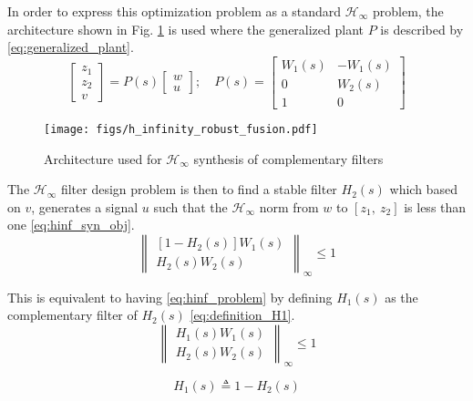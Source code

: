 \documentclass[letterpaper, 10 pt, conference]{ieeeconf}
\begin{document}
In order to express this optimization problem as a standard \(\mathcal{H}_\infty\) problem, the architecture shown in Fig. \ref{fig:h_infinity_robust_fusion} is used where the generalized plant \(P\) is described by \eqref{eq:generalized_plant}.
\begin{equation}
\label{eq:generalized_plant}
  \begin{bmatrix} z_1 \\ z_2 \\ v \end{bmatrix} = P(s) \begin{bmatrix} w\\u \end{bmatrix}; \quad P(s) = \begin{bmatrix}W_1(s) & -W_1(s) \\ 0 & W_2(s) \\  1 & 0 \end{bmatrix}
\end{equation}

\begin{figure}[htbp]
\centering
\texttt{[image: figs/h\_infinity\_robust\_fusion.pdf]}
\caption{\label{fig:h_infinity_robust_fusion}
Architecture used for \(\mathcal{H}_\infty\) synthesis of complementary filters}
\end{figure}

The \(\mathcal{H}_\infty\) filter design problem is then to find a stable filter \(H_2(s)\) which based on \(v\), generates a signal \(u\) such that the \(\mathcal{H}_\infty\) norm from \(w\) to \([z_1, \ z_2]\) is less than one \eqref{eq:hinf_syn_obj}.
\begin{equation}
\label{eq:hinf_syn_obj}
  \left\|\begin{matrix} \left[1 - H_2(s)\right] W_1(s) \\ H_2(s) W_2(s) \end{matrix}\right\|_\infty \le 1
\end{equation}

This is equivalent to having \eqref{eq:hinf_problem} by defining \(H_1(s)\) as the complementary filter of \(H_2(s)\) \eqref{eq:definition_H1}.
\begin{equation}
\label{eq:hinf_problem}
  \left\|\begin{matrix} H_1(s) W_1(s) \\ H_2(s) W_2(s) \end{matrix}\right\|_\infty \le 1
\end{equation}

\begin{equation}
\label{eq:definition_H1}
  H_1(s) \triangleq 1 - H_2(s)
\end{equation}
\end{document}
